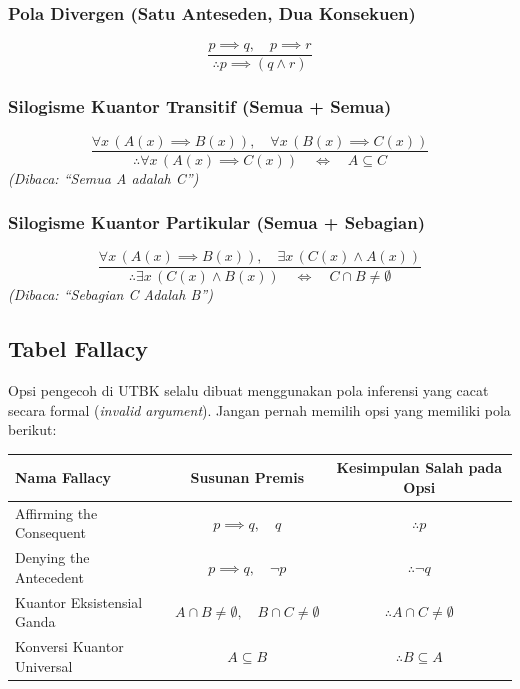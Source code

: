 \subsubsection{Pola Divergen (Satu Anteseden, Dua Konsekuen)}
\[ \frac{p \implies q, \quad p \implies r}{\therefore p \implies (q \land r)} \]

\subsubsection{Silogisme Kuantor Transitif (Semua + Semua)}
\[ \frac{\forall x \, (A(x) \implies B(x)), \quad \forall x \, (B(x) \implies C(x))}{\therefore \forall x \, (A(x) \implies C(x)) \quad \iff \quad A \subseteq C} \]
\textit{(Dibaca: ``Semua A adalah C'')}

\subsubsection{Silogisme Kuantor Partikular (Semua + Sebagian)}
\[ \frac{\forall x \, (A(x) \implies B(x)), \quad \exists x \, (C(x) \land A(x))}{\therefore \exists x \, (C(x) \land B(x)) \quad \iff \quad C \cap B \neq \emptyset} \]
\textit{(Dibaca: ``Sebagian C Adalah B'')}

\newpage

\subsection{Tabel Fallacy}
Opsi pengecoh di UTBK selalu dibuat menggunakan pola inferensi yang cacat secara formal (\textit{invalid argument}). Jangan pernah memilih opsi yang memiliki pola berikut:

\begin{table}[h]
  \centering
  \begin{tabular}{lcc}
    \toprule
    \textbf{Nama Fallacy} & \textbf{Susunan Premis} & \textbf{Kesimpulan Salah pada Opsi} \\
    \midrule
    Affirming the Consequent & $p \implies q, \quad q$ & $\therefore p$ \\
    \addlinespace
    Denying the Antecedent & $p \implies q, \quad \neg p$ & $\therefore \neg q$ \\
    \addlinespace
    Kuantor Eksistensial Ganda & $A \cap B \neq \emptyset, \quad B \cap C \neq \emptyset$ & $\therefore A \cap C \neq \emptyset$ \\
    \addlinespace
    Konversi Kuantor Universal & $A \subseteq B$ & $\therefore B \subseteq A$ \\
    \bottomrule
  \end{tabular}
\end{table}
